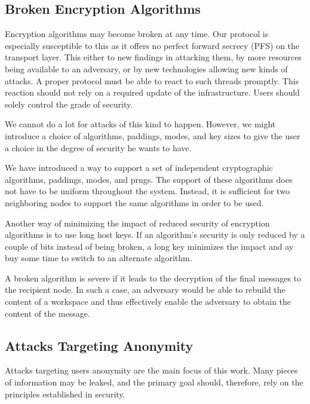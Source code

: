 \subsection{Broken Encryption Algorithms}
Encryption algorithms may become broken at any time. Our protocol is especially susceptible to this as it offers no perfect forward secrecy (PFS) on the transport layer. This either to new findings in attacking them, by more resources being available to an adversary, or by new technologies allowing new kinds of attacks. A proper protocol must be able to react to such threads promptly. This reaction should not rely on a required update of the infrastructure. Users should solely control the grade of security. 

We cannot do a lot for attacks of this kind to happen. However, we might introduce a choice of algorithms, paddings, modes, and key sizes to give the user a choice in the degree of security he wants to have.

We have introduced a way to support a set of independent cryptographic algorithms, paddings, modes, and prngs. The support of these algorithms does not have to be uniform throughout the system. Instead, it is sufficient for two neighboring nodes to support the same algorithms in order to be used. 

Another way of minimizing the impact of reduced security of encryption algorithms is to use long host keys. If an algorithm's security is only reduced by a couple of bits instead of being broken, a long key minimizes the impact and ay buy some time to switch to an alternate algorithm. 

A broken algorithm is severe if it leads to the decryption of the final messages to the recipient node. In such a case, an adversary would be able to rebuild the content of a workspace and thus effectively enable the adversary to obtain the content of the message.

\subsection{Attacks Targeting Anonymity}
Attacks targeting users anonymity are the main focus of this work. Many pieces of information may be leaked, and the primary goal should, therefore, rely on the principles established in security.

